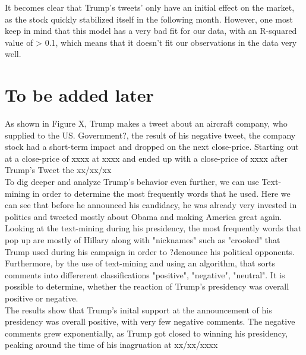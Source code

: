 \documentclass{article}
\begin{document}
It becomes clear that Trump's tweets' only have an initial effect on the market, as the stock quickly stabilized itself in the following month. However, one most keep in mind that this model has a very bad fit for our data, with an R-squared value of > 0.1, which means that it doesn't fit our observations in the data very well. 




\section{To be added later}

As shown in Figure X, Trump makes a tweet about an aircraft company, who supplied to the US. Government?, the result of his negative tweet, the company stock had a short-term impact and dropped on the next close-price. Starting out at a close-price of xxxx at xxxx and ended up with a close-price of xxxx after Trump's Tweet the xx/xx/xx \\

To dig deeper and analyze Trump's behavior even further, we can use Text-mining in order to determine the most frequently words that he used. Here we can see that before he announced his candidacy, he was already very invested in politics and tweeted mostly about Obama and making America great again. Looking at the text-mining during his presidency, the most frequently words that pop up are mostly of Hillary along with "nicknames" such as "crooked" that Trump used during his campaign in order to ?denounce his political opponents.  \\


Furthermore, by the use of text-mining and using an algorithm, that sorts comments into differerent classifications "positive", "negative", "neutral". It is possible to determine, whether the reaction of Trump's presidency was overall positive or negative. \\

The results show that Trump's inital support at the announcement of his presidency was overall positive, with very few negative comments.  The negative comments grew exponentially, as Trump got closed to winning his presidency, peaking around the time of his inagruation at xx/xx/xxxx




\end{document}
